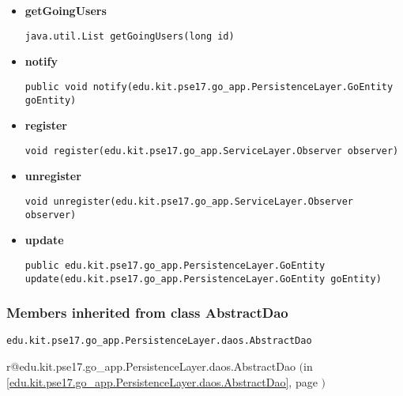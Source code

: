\documentclass[11pt,a4paper]{report}
\makeatletter
\newcommand{\refdefined}[1]{
\expandafter\ifx\csname r@#1\endcsname\relax
\relax\else
{$($in \ref{#1}, page \pageref{#1}$)$}\fi}
\makeatother
\begin{document}
{{{{{{{{{{{{\begin{itemize}
{\begin{lstlisting}[frame=none]
java.util.List getDeclinedusers(long id)\end{lstlisting} %
}%
\item{ 
\hypertarget{edu.kit.pse17.go_app.PersistenceLayer.daos.GoDaoImp.getGoingUsers(long)}{{\bf  getGoingUsers}\\}
\begin{lstlisting}[frame=none]
java.util.List getGoingUsers(long id)\end{lstlisting} %
}%
\item{ 
\hypertarget{edu.kit.pse17.go_app.PersistenceLayer.daos.GoDaoImp.notify(edu.kit.pse17.go_app.PersistenceLayer.GoEntity)}{{\bf  notify}\\}
\begin{lstlisting}[frame=none]
public void notify(edu.kit.pse17.go_app.PersistenceLayer.GoEntity goEntity)\end{lstlisting} %
}%
\item{ 
\hypertarget{edu.kit.pse17.go_app.PersistenceLayer.daos.GoDaoImp.register(edu.kit.pse17.go_app.ServiceLayer.Observer)}{{\bf  register}\\}
\begin{lstlisting}[frame=none]
void register(edu.kit.pse17.go_app.ServiceLayer.Observer observer)\end{lstlisting} %
}%
\item{ 
\hypertarget{edu.kit.pse17.go_app.PersistenceLayer.daos.GoDaoImp.unregister(edu.kit.pse17.go_app.ServiceLayer.Observer)}{{\bf  unregister}\\}
\begin{lstlisting}[frame=none]
void unregister(edu.kit.pse17.go_app.ServiceLayer.Observer observer)\end{lstlisting} %
}%
\item{ 
\hypertarget{edu.kit.pse17.go_app.PersistenceLayer.daos.GoDaoImp.update(edu.kit.pse17.go_app.PersistenceLayer.GoEntity)}{{\bf  update}\\}
\begin{lstlisting}[frame=none]
public edu.kit.pse17.go_app.PersistenceLayer.GoEntity update(edu.kit.pse17.go_app.PersistenceLayer.GoEntity goEntity)\end{lstlisting} %
}%
\end{itemize}
}
\subsubsection{Members inherited from class AbstractDao }{
\texttt{edu.kit.pse17.go_app.PersistenceLayer.daos.AbstractDao} {\small 
\refdefined{edu.kit.pse17.go_app.PersistenceLayer.daos.AbstractDao}}
{\small 

}}}}}}}}}}}}}
\end{document}
